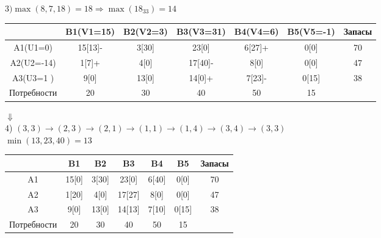 \documentclass[a4paper, 12pt]{article}
\begin{document}
\begin{math}
  3) \max(8,7,18)= 18 \Rightarrow \max(18_{33}) = 14
\end{math}
\begin{table}[H]
\centering
\begin{tabular}{|c|c|c|c|c|c|c|}
\hline
            & B1(V1=15)& B2(V2=3) & B3(V3=31) & B4(V4=6)  & B5(V5=-1) & Запасы \\ \hline
A1(U1=0)    & 15[13]-  & 3[30]    & 23[0]     & 6[27]+    & 0[0]      & 70     \\ \hline
A2(U2=-14)  & 1[7]+    & 4[0]     & 17[40]-   & 8[0]      & 0[0]      & 47     \\ \hline
A3(U3=1 )   & 9[0]     & 13[0]    & 14[0]+    & 7[23]-    & 0[15]     & 38     \\ \hline
Потребности & 20       & 30       & 40        & 50        & 15        &        \\ \hline
\end{tabular}
\end{table}

\begin{center}
  $\Downarrow$\\
  4) $(3,3)\rightarrow(2,3)\rightarrow(2,1)\rightarrow(1,1)\rightarrow(1,4)\rightarrow(3,4)\rightarrow(3,3)$\\
  $\min(13,23,40) = 13$
\end{center}
\begin{table}[H]
\centering
\begin{tabular}{|c|c|c|c|c|c|c|}
\hline
     & B1       & B2       & B3        & B4        & B5        & Запасы \\ \hline
A1   & 15[0]    & 3[30]    & 23[0]     & 6[40]     & 0[0]      & 70     \\ \hline
A2   & 1[20]    & 4[0]     & 17[27]    & 8[0]      & 0[0]      & 47     \\ \hline
A3   & 9[0]     & 13[0]    & 14[13]    & 7[10]     & 0[15]     & 38     \\ \hline
Потребности & 20       & 30       & 40        & 50        & 15        &        \\ \hline
\end{tabular}
\end{table}
\end{document}
